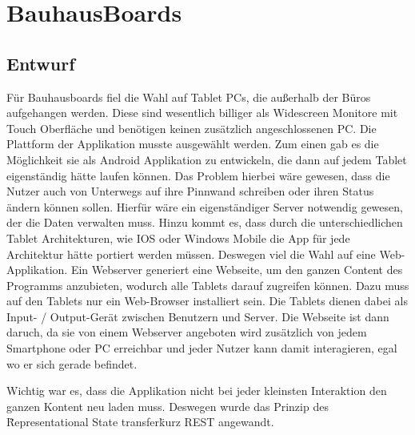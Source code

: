 \chapter{BauhausBoards}\label{BauhausBoards}
\section{Entwurf}\label{Entwurf}

Für Bauhausboards fiel die Wahl auf Tablet PCs, die außerhalb der Büros aufgehangen werden.
Diese sind wesentlich billiger als Widescreen Monitore mit Touch Oberfläche und benötigen keinen zusätzlich angeschlossenen PC.
Die Plattform der Applikation musste ausgewählt werden. Zum einen gab es die Möglichkeit sie als Android Applikation zu entwickeln, die dann auf jedem Tablet eigenständig hätte laufen können. Das Problem hierbei wäre gewesen, dass die Nutzer auch von Unterwegs auf ihre Pinnwand schreiben oder ihren Status ändern können sollen. Hierfür wäre ein eigenständiger Server notwendig gewesen, der die Daten verwalten muss. Hinzu kommt es, dass durch die unterschiedlichen Tablet Architekturen, wie IOS oder Windows Mobile die App für jede Architektur hätte portiert werden müssen.
Deswegen viel die Wahl auf eine Web-Applikation. Ein Webserver generiert eine Webseite, um den ganzen Content des Programms anzubieten, wodurch alle Tablets  darauf zugreifen können. Dazu muss auf den Tablets nur ein Web-Browser installiert sein.
Die Tablets dienen dabei als Input- / Output-Gerät zwischen Benutzern und Server. Die Webseite ist dann daruch, da sie von einem Webserver angeboten wird zusätzlich von jedem Smartphone oder PC erreichbar und jeder Nutzer kann damit interagieren, egal wo er sich gerade befindet.

Wichtig war es, dass die Applikation nicht bei jeder kleinsten Interaktion den ganzen Kontent neu laden muss. Deswegen wurde das Prinzip des \"Representational State transfer\" kurz REST angewandt.




